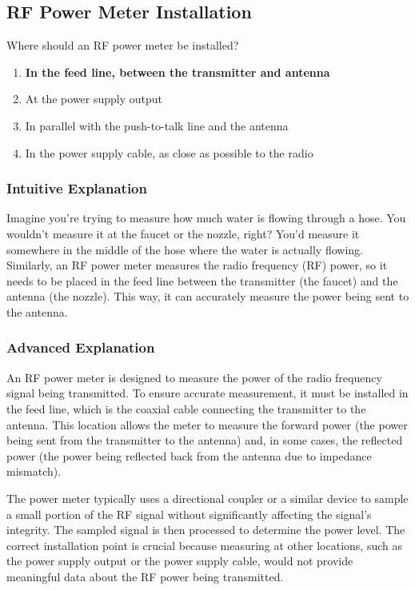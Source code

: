 \subsection{RF Power Meter Installation}
\label{T4A05}

\begin{tcolorbox}[colback=gray!10!white,colframe=black!75!black,title=T4A05]
Where should an RF power meter be installed?
\begin{enumerate}[label=\Alph*)]
    \item \textbf{In the feed line, between the transmitter and antenna}
    \item At the power supply output
    \item In parallel with the push-to-talk line and the antenna
    \item In the power supply cable, as close as possible to the radio
\end{enumerate}
\end{tcolorbox}

\subsubsection*{Intuitive Explanation}
Imagine you're trying to measure how much water is flowing through a hose. You wouldn't measure it at the faucet or the nozzle, right? You'd measure it somewhere in the middle of the hose where the water is actually flowing. Similarly, an RF power meter measures the radio frequency (RF) power, so it needs to be placed in the feed line between the transmitter (the faucet) and the antenna (the nozzle). This way, it can accurately measure the power being sent to the antenna.

\subsubsection*{Advanced Explanation}
An RF power meter is designed to measure the power of the radio frequency signal being transmitted. To ensure accurate measurement, it must be installed in the feed line, which is the coaxial cable connecting the transmitter to the antenna. This location allows the meter to measure the forward power (the power being sent from the transmitter to the antenna) and, in some cases, the reflected power (the power being reflected back from the antenna due to impedance mismatch).

The power meter typically uses a directional coupler or a similar device to sample a small portion of the RF signal without significantly affecting the signal's integrity. The sampled signal is then processed to determine the power level. The correct installation point is crucial because measuring at other locations, such as the power supply output or the power supply cable, would not provide meaningful data about the RF power being transmitted.

